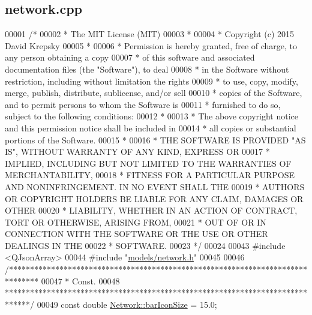 \hypertarget{network_8cpp_source}{}\subsection{network.\+cpp}
\label{network_8cpp_source}

\begin{DoxyCode}
00001 \textcolor{comment}{/*}
00002 \textcolor{comment}{ * The MIT License (MIT)}
00003 \textcolor{comment}{ *}
00004 \textcolor{comment}{ * Copyright (c) 2015 David Krepsky}
00005 \textcolor{comment}{ *}
00006 \textcolor{comment}{ * Permission is hereby granted, free of charge, to any person obtaining a copy}
00007 \textcolor{comment}{ * of this software and associated documentation files (the "Software"), to deal}
00008 \textcolor{comment}{ * in the Software without restriction, including without limitation the rights}
00009 \textcolor{comment}{ * to use, copy, modify, merge, publish, distribute, sublicense, and/or sell}
00010 \textcolor{comment}{ * copies of the Software, and to permit persons to whom the Software is}
00011 \textcolor{comment}{ * furnished to do so, subject to the following conditions:}
00012 \textcolor{comment}{ *}
00013 \textcolor{comment}{ * The above copyright notice and this permission notice shall be included in}
00014 \textcolor{comment}{ * all copies or substantial portions of the Software.}
00015 \textcolor{comment}{ *}
00016 \textcolor{comment}{ * THE SOFTWARE IS PROVIDED "AS IS", WITHOUT WARRANTY OF ANY KIND, EXPRESS OR}
00017 \textcolor{comment}{ * IMPLIED, INCLUDING BUT NOT LIMITED TO THE WARRANTIES OF MERCHANTABILITY,}
00018 \textcolor{comment}{ * FITNESS FOR A PARTICULAR PURPOSE AND NONINFRINGEMENT. IN NO EVENT SHALL THE}
00019 \textcolor{comment}{ * AUTHORS OR COPYRIGHT HOLDERS BE LIABLE FOR ANY CLAIM, DAMAGES OR OTHER}
00020 \textcolor{comment}{ * LIABILITY, WHETHER IN AN ACTION OF CONTRACT, TORT OR OTHERWISE, ARISING FROM,}
00021 \textcolor{comment}{ * OUT OF OR IN CONNECTION WITH THE SOFTWARE OR THE USE OR OTHER DEALINGS IN THE}
00022 \textcolor{comment}{ * SOFTWARE.}
00023 \textcolor{comment}{ */}
00024 
00043 \textcolor{preprocessor}{#include <QJsonArray>}
00044 \textcolor{preprocessor}{#include "\hyperlink{network_8h}{models/network.h}"}
00045 
00046 \textcolor{comment}{/*******************************************************************************}
00047 \textcolor{comment}{ * Const.}
00048 \textcolor{comment}{ ******************************************************************************/}
00049 \textcolor{keyword}{const} \textcolor{keywordtype}{double} \hyperlink{group___graphics_gaa334bbc93b3fde219840e95e23198b53}{Network::barIconSize} = 15.0;

\end{DoxyCode}
